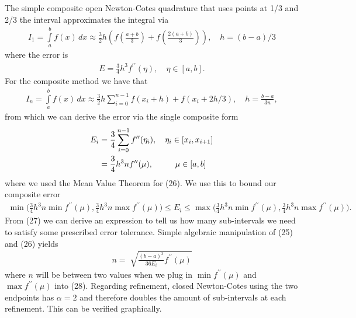 \documentclass[12pt]{article}
\theoremstyle{remark}
\begin{document}
The simple composite open Newton-Cotes quadrature that uses points at 1/3 and 2/3 the interval approximates the integral via
\begin{align}
I_1 = \displaystyle\int\limits_a^b f(x) \, dx \approx \frac{3}{2}h(f(\frac{a+b}{3}) + f(\frac{2(a+b)}{3})), \quad h = (b - a)/3
\end{align}
where the error is 
\begin{align}
E = \frac{3}{4}h^3f^{\prime\prime}(\eta), \quad \eta \in [a,b].
\end{align}
For the composite method we have that 
\begin{align}
I_n = \displaystyle\int\limits_a^b f(x) \, dx \approx \frac{3}{2}h \sum\limits_{i=0}^{n-1} f(x_i+ h) + f(x_i + 2h/3), \quad h = \frac{b-a}{3n},
\end{align}
from which we can derive the error via the single composite form 
\begin{align}
E_i & = \frac{3}{4}\sum\limits_{i=0}^{n-1} f^{\prime\prime}(\eta_i), \quad \eta_i \in [x_i, x_{i+1}] \\
& = \frac{3}{4}h^3nf^{\prime\prime}(\mu), \quad \hskip 0.6cm \mu \in [a,b]
\end{align}
where we used the Mean Value Theorem for (26). We use this to bound our composite error 
\begin{align}
\min\bigg(\frac{3}{4}h^3n\min f^{\prime\prime}(\mu),\frac{3}{4}h^3n\max f^{\prime\prime}(\mu) \bigg) \leq E_i \leq \max\bigg(\frac{3}{4}h^3n\min f^{\prime\prime}(\mu),\frac{3}{4}h^3n\max f^{\prime\prime}(\mu) \bigg).
\end{align}
From (27) we can derive an expression to tell us how many sub-intervals we need to satisfy some prescribed error tolerance. Simple algebraic manipulation of (25) and (26) yields
\begin{align}
n = \sqrt[]{\frac{(b-a)^3}{36E_i}f^{\prime\prime}(\mu)}
\end{align}
where $n$ will be between two values when we plug in $\min f^{\prime\prime}(\mu)$ and $\max f^{\prime\prime}(\mu)$ into (28).
Regarding refinement, closed Newton-Cotes using the two endpoints has $\alpha = 2$ and therefore doubles the amount of sub-intervals at each refinement. This can be verified graphically.
\end{document}
